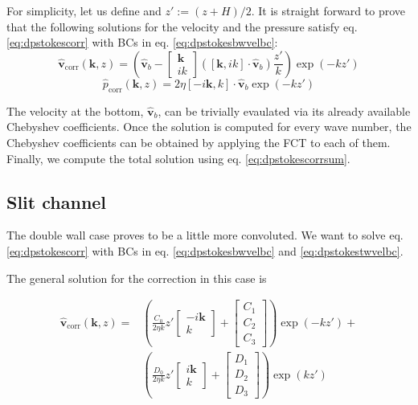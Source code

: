\documentclass[ twoside,openright,titlepage,numbers=noenddot,%
headinclude,footinclude,cleardoublepage=empty,abstract=on,
BCOR=5mm,paper=a4,fontsize=11pt, dvipsnames
]{scrreprt}
\renewcommand{\vec}[1]{\bm{#1}}
\newcommand{\fou}[1]{\widehat{#1}}
\newcommand{\fvel}{v}
\newcommand{\corr}{\text{corr}}
\begin{document}
For simplicity, let us define and $z':=(z+H)/2$.
It is straight forward to prove that the following solutions for the velocity and the pressure satisfy eq. \eqref{eq:dpstokescorr} with \glspl{BC} in eq. \eqref{eq:dpstokesbwvelbc}:
\begin{equation}
  \fou{\vec{\fvel}}_{\corr}(\vec{k}, z) = \left(  \fou{\vec{\fvel}}_b -
    \begin{bmatrix}
    \vec{k}\\
    ik
  \end{bmatrix}
  \left(\left[\vec{k},ik\right]\cdot\fou{\vec{\fvel}}_b\right) \frac{z'}{k}\right)\exp\left(-kz'\right)
\end{equation}
\begin{equation}
  \fou{p}_{\corr}(\vec{k}, z) = 2\eta \left[-i\vec{k},k\right]\cdot\fou{\vec{\fvel}}_b\exp\left(-kz'\right)
\end{equation}

The velocity at the bottom, $\fou{\vec{\fvel}}_b$, can be trivially evaulated via its already available Chebyshev coefficients. Once the solution is computed for every wave number, the Chebyshev coefficients can be obtained by applying the \gls{FCT} to each of them. Finally, we compute the total solution using eq. \eqref{eq:dpstokescorrsum}.

\subsection*{Slit channel}
The double wall case proves to be a little more convoluted. We want to solve eq. \eqref{eq:dpstokescorr} with \glspl{BC} in eq. \eqref{eq:dpstokesbwvelbc} and \eqref{eq:dpstokestwvelbc}.

The general solution for the correction in this case is

\begin{equation}
  \label{eq:dpstokesslitcor}
  \begin{aligned}
    \fou{\vec{\fvel}}_{\corr}(\vec{k}, z) =& \left(\frac{C_0}{2\eta k} z'
      \begin{bmatrix}
        -i\vec{k}\\
        k
      \end{bmatrix}
      +
      \begin{bmatrix}
        C_1\\
        C_2\\
        C_3
      \end{bmatrix}
    \right)
    \exp(-kz')+\\    
    &\left(\frac{D_0}{2\eta k} z'
      \begin{bmatrix}
        i\vec{k}\\
        k
      \end{bmatrix}
      +
      \begin{bmatrix}
        D_1\\
        D_2\\
        D_3
      \end{bmatrix}
    \right)\exp(kz')
  \end{aligned}
\end{equation}
\end{document}
